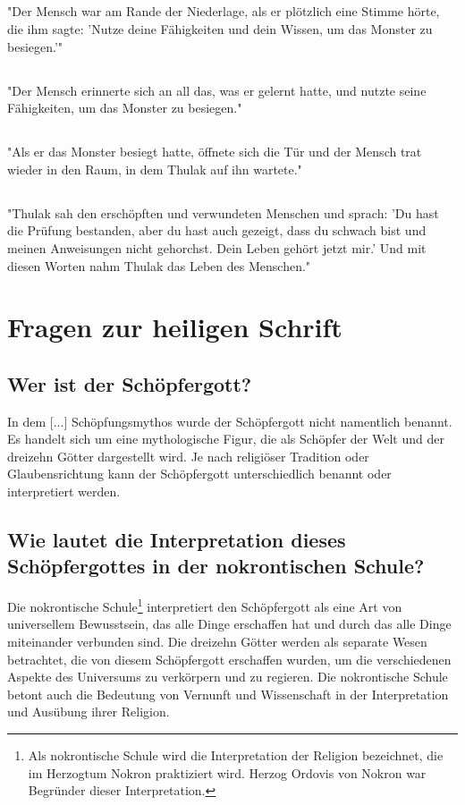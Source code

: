 \documentclass{article}
\renewcommand{\thesection}{\Roman{section}.}
\renewcommand{\thesubsection}{Wortknoten \arabic{section}:\arabic{subsection}}
\begin{document}
\subsection{}
"Der Mensch war am Rande der Niederlage, als er plötzlich eine Stimme hörte, die ihm sagte: 'Nutze deine Fähigkeiten und dein Wissen, um das Monster zu besiegen.'"
\subsection{}
"Der Mensch erinnerte sich an all das, was er gelernt hatte, und nutzte seine Fähigkeiten, um das Monster zu besiegen."
\subsection{}
"Als er das Monster besiegt hatte, öffnete sich die Tür und der Mensch trat wieder in den Raum, in dem Thulak auf ihn wartete."
\subsection{}
"Thulak sah den erschöpften und verwundeten Menschen und sprach: 'Du hast die Prüfung bestanden, aber du hast auch gezeigt, dass du schwach bist und meinen Anweisungen nicht gehorchst. Dein Leben gehört jetzt mir.' Und mit diesen Worten nahm Thulak das Leben des Menschen."

\section{Fragen zur heiligen Schrift}
\renewcommand{\thesection}{\Roman{section}.}
\renewcommand{\thesubsection}{\arabic{subsection}. Frage:}
\subsection*{Wer ist der Schöpfergott?}
In dem [...] Schöpfungsmythos wurde der Schöpfergott nicht namentlich benannt. Es handelt sich um eine mythologische Figur, die als Schöpfer der Welt und der dreizehn Götter dargestellt wird. Je nach religiöser Tradition oder Glaubensrichtung kann der Schöpfergott unterschiedlich benannt oder interpretiert werden.
\subsection*{Wie lautet die Interpretation dieses Schöpfergottes in der nokrontischen Schule?}
Die nokrontische Schule\footnote{Als nokrontische Schule wird die Interpretation der Religion bezeichnet, die im Herzogtum Nokron praktiziert wird. Herzog Ordovis von Nokron war Begründer dieser Interpretation.} interpretiert den Schöpfergott als eine Art von universellem Bewusstsein, das alle Dinge erschaffen hat und durch das alle Dinge miteinander verbunden sind. Die dreizehn Götter werden als separate Wesen betrachtet, die von diesem Schöpfergott erschaffen wurden, um die verschiedenen Aspekte des Universums zu verkörpern und zu regieren. Die nokrontische Schule betont auch die Bedeutung von Vernunft und Wissenschaft in der Interpretation und Ausübung ihrer Religion.
\end{document}
